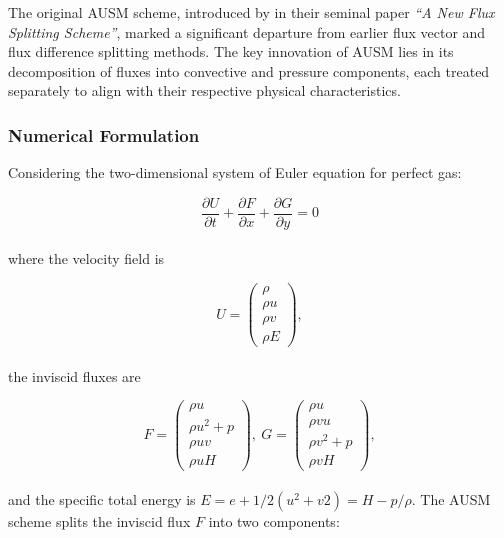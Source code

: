 \documentclass[a5paper]{sapthesis}
\begin{document}
	The original AUSM scheme, introduced by \citet{LIOU_AUSM} in their seminal paper \textit{“A New Flux Splitting Scheme”}, marked a significant departure from earlier flux vector and flux difference splitting methods. The key innovation of AUSM lies in its decomposition of fluxes into convective and pressure components, each treated separately to align with their respective physical characteristics.
	
	\subsubsection*{Numerical Formulation}
	
	Considering the two-dimensional system of Euler equation for perfect gas:
	
	\begin{equation}
		\dfrac{\partial{U}}{\partial{t}} + \dfrac{\partial{F}}{\partial{x}} +
		\dfrac{\partial{G}}{\partial{y}} = 0
	\end{equation}
	\\
	where the velocity field is 
	
	\begin{equation}
		U =
		\begin{pmatrix}
			\rho    \\
			\rho u  \\
			\rho v  \\
			\rho E
		\end{pmatrix},
	\end{equation}
	\\
	the inviscid fluxes are 
	
	\begin{equation}
		F =
		\begin{pmatrix}
			\rho u       \\
			\rho u^2 + p \\
			\rho uv      \\
			\rho u H
		\end{pmatrix}, \
		G =
		\begin{pmatrix}
			\rho u       \\
			\rho vu		 \\
			\rho v^2 + p \\
			\rho v H
		\end{pmatrix},
	\end{equation}
	\\
	and the specific total energy is $E = e +1/2(u^2+v2) = H -p/\rho$.	
	The AUSM scheme splits the inviscid flux $F$ into two components:
	
\end{document}
